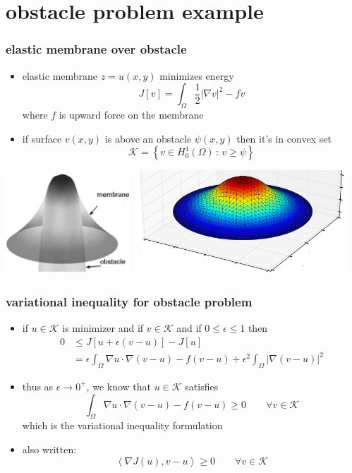 \documentclass{beamer}
\newcommand{\eps}{\epsilon}
\newcommand{\grad}{\nabla}
\begin{document}
\section[obstacle]{obstacle problem example}

\begin{frame}
  \frametitle{elastic membrane over obstacle}

\begin{itemize}
\item elastic membrane $z = u(x,y)$ minimizes energy
$$J[v] = \int_\Omega \frac{1}{2} |\grad v|^2 - f v$$
where $f$ is upward force on the membrane
\item if surface $v(x,y)$ is above an obstacle $\psi(x,y)$ then it's in convex set
$$\mathcal{K} = \left\{v \in H_0^1(\Omega) \,:\, v \ge \psi\right\}$$
\end{itemize}

\begin{center}
\includegraphics[width=0.35\textwidth]{figs/classicalobs} \quad \includegraphics[width=0.6\textwidth]{figs/obs-soln}
\end{center}
\end{frame}


\begin{frame}
  \frametitle{variational inequality for obstacle problem}

\begin{itemize}
\item if $u\in \mathcal{K}$ is minimizer and if $v\in\mathcal{K}$ and if $0\le \eps \le 1$ then
   \begin{align*}
   0 &\le J[u + \eps(v-u)] - J[u] \\
     &= \eps \int_\Omega \grad u \cdot \grad(v-u) - f (v-u) + \eps^2 \int_\Omega |\grad(v-u)|^2
   \end{align*}
\item thus as $\eps \to 0^+$, we know that $u\in\mathcal{K}$ satisfies
  $$\int_\Omega \grad u \cdot \grad(v-u) - f (v-u) \ge 0 \qquad \forall v\in\mathcal{K}$$
which is the variational inequality formulation
\item also written:
  $$\left<\grad J(u), v-u\right> \ge 0 \qquad \forall v\in\mathcal{K}$$
\end{itemize}
\end{frame}
\end{document}
